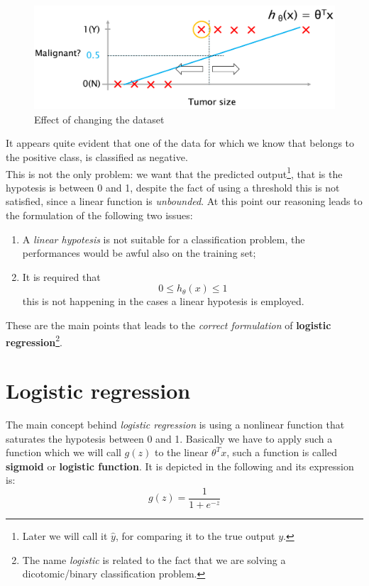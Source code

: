 \begin{figure}[h]
    \centering
    \includegraphics[scale=0.5]{img/Class_vs_Reg2.png}
    \caption{Effect of changing the dataset}
\end{figure}
It appears quite evident that one of the data for which we know that belongs to the positive class, is classified as negative.\\
This is not the only problem: we want that the predicted output\footnote{
    Later we will call it $\hat{y}$, for comparing it to the true output $y$.
}, that is the hypotesis is between 0 and 1, despite the fact of using a threshold this is not satisfied, since a linear function is \textit{unbounded}. At this point our reasoning leads to the formulation of the following two issues:
\begin{enumerate}
    \item A \textit{linear hypotesis} is not suitable for a classification problem, the performances would be awful also on the training set; 
    \item It is required that $$ 0 \le h_\theta(x) \le 1$$ this is not happening in the cases a linear hypotesis is employed.
\end{enumerate}
These are the main points that leads to the \textit{correct formulation} of \textbf{logistic regression}\footnote{
    The name \textit{logistic} is related to the fact that we are solving a dicotomic/binary classification problem.
}.

\section{Logistic regression}
The main concept behind \textit{logistic regression} is using a nonlinear function that saturates the hypotesis between 0 and 1. Basically we have to apply such a function which we will call $g(z)$ to the linear $\theta^T{x}$, such a function is called \textbf{sigmoid} or \textbf{logistic function}. It is depicted in the following and its expression is:
\begin{equation}
    g(z)=\frac{1}{1+e^{-z}}
\end{equation}

